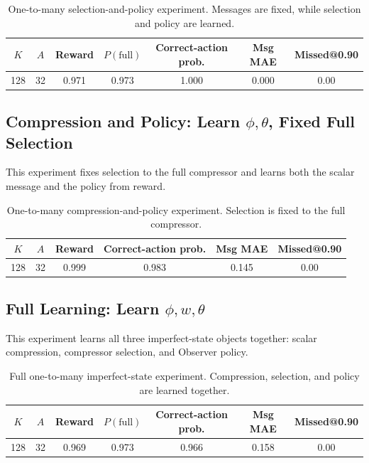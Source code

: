 \documentclass[11pt]{article}
\begin{document}
\begin{table}[H]
\centering
\small
\begin{tabular}{ccccccc}
\toprule
\(K\) & \(A\) & Reward & \(P(\mathrm{full})\) & Correct-action prob. & Msg MAE & Missed@0.90 \\
\midrule
128 & 32 & 0.971 & 0.973 & 1.000 & 0.000 & 0.00 \\
\bottomrule
\end{tabular}
\caption{One-to-many selection-and-policy experiment. Messages are fixed, while
selection and policy are learned.}
\label{tab:one-to-many-w-theta}
\end{table}

\subsection{Compression and Policy: Learn \(\phi,\theta\), Fixed Full Selection}

This experiment fixes selection to the full compressor and learns both the
scalar message and the policy from reward.

\begin{table}[H]
\centering
\small
\begin{tabular}{cccccc}
\toprule
\(K\) & \(A\) & Reward & Correct-action prob. & Msg MAE & Missed@0.90 \\
\midrule
128 & 32 & 0.999 & 0.983 & 0.145 & 0.00 \\
\bottomrule
\end{tabular}
\caption{One-to-many compression-and-policy experiment. Selection is fixed to
the full compressor.}
\label{tab:one-to-many-phi-theta}
\end{table}

\subsection{Full Learning: Learn \(\phi,w,\theta\)}

This experiment learns all three imperfect-state objects together: scalar
compression, compressor selection, and Observer policy.

\begin{table}[H]
\centering
\small
\begin{tabular}{ccccccc}
\toprule
\(K\) & \(A\) & Reward & \(P(\mathrm{full})\) & Correct-action prob. & Msg MAE & Missed@0.90 \\
\midrule
128 & 32 & 0.969 & 0.973 & 0.966 & 0.158 & 0.00 \\
\bottomrule
\end{tabular}
\caption{Full one-to-many imperfect-state experiment. Compression, selection,
and policy are learned together.}
\label{tab:one-to-many-full}
\end{table}
\end{document}
